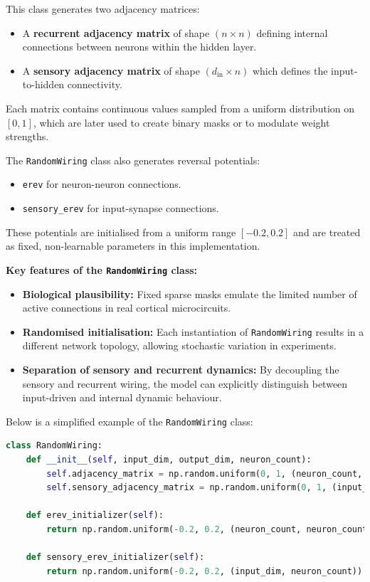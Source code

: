 This class generates two adjacency matrices:
\begin{itemize}
    \item A \textbf{recurrent adjacency matrix} of shape $(n \times n)$ defining internal connections between neurons within the hidden layer.
    \item A \textbf{sensory adjacency matrix} of shape $(d_{\text{in}} \times n)$ which defines the input-to-hidden connectivity.
\end{itemize}
Each matrix contains continuous values sampled from a uniform distribution on $[0, 1]$, which are later used to create binary masks or to modulate weight strengths.

The \texttt{RandomWiring} class also generates reversal potentials:
\begin{itemize}
    \item \texttt{erev} for neuron-neuron connections.
    \item \texttt{sensory\_erev} for input-synapse connections.
\end{itemize}
These potentials are initialised from a uniform range $[-0.2, 0.2]$ and are treated as fixed, non-learnable parameters in this implementation.

\vspace{1em}
\noindent \textbf{Key features of the \texttt{RandomWiring} class:}
\begin{itemize}
    \item \textbf{Biological plausibility:} Fixed sparse masks emulate the limited number of active connections in real cortical microcircuits.
    \item \textbf{Randomised initialisation:} Each instantiation of \texttt{RandomWiring} results in a different network topology, allowing stochastic variation in experiments.
    \item \textbf{Separation of sensory and recurrent dynamics:} By decoupling the sensory and recurrent wiring, the model can explicitly distinguish between input-driven and internal dynamic behaviour.
\end{itemize}

\noindent Below is a simplified example of the \texttt{RandomWiring} class:
\begin{lstlisting}[language=Python, caption={Simplified RandomWiring class}]
class RandomWiring:
    def __init__(self, input_dim, output_dim, neuron_count):
        self.adjacency_matrix = np.random.uniform(0, 1, (neuron_count, neuron_count))
        self.sensory_adjacency_matrix = np.random.uniform(0, 1, (input_dim, neuron_count))
        
    def erev_initializer(self):
        return np.random.uniform(-0.2, 0.2, (neuron_count, neuron_count))

    def sensory_erev_initializer(self):
        return np.random.uniform(-0.2, 0.2, (input_dim, neuron_count))
\end{lstlisting}

